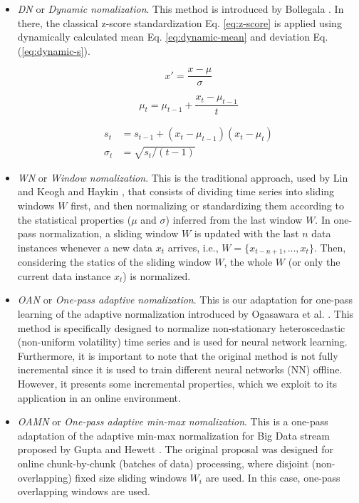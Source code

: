 \documentclass[a4paper]{article}\usepackage[]{graphicx}\usepackage[]{color}
\begin{document}
\begin{itemize}

\item \emph{DN} or \emph{Dynamic nomalization}. This method is introduced by Bollegala \cite{Bollegala2017}. In there, the classical z-score standardization Eq. \eqref{eq:z-score} is applied using dynamically calculated mean Eq. \eqref{eq:dynamic-mean} and deviation Eq. (\ref{eq:dynamic-s}).

\begin{equation}\label{eq:z-score}
    x' = \frac{x - \mu}{\sigma}
\end{equation}

\begin{equation} \label{eq:dynamic-mean}
    \mu_{t} = \mu_{t-1} + \frac{x_{t} - \mu_{t-1}}{t}
\end{equation}

\begin{equation} \begin{aligned} \label{eq:dynamic-s}
    s_{t} &= s_{t-1} + (x_{t} - \mu_{t-1})(x_{t} - \mu_{t}) \\
    \sigma_{t} &= \sqrt{s_{t} / (t-1)}
\end{aligned} \end{equation}

\item \emph{WN} or \emph{Window nomalization}. This is the traditional approach, used by  Lin and Keogh \cite{Lin2004} and Haykin  \cite{haykin2009neural}, that consists of dividing time series into sliding windows $W$ first, and then normalizing or standardizing them according to the statistical properties ($\mu$ and $\sigma$) inferred from the last window $W$. In one-pass normalization, a sliding window $W$ is updated with the last $n$ data instances whenever a new data $x_{t}$ arrives, i.e.,  $W = \{x_{t-n+1}, ..., x_{t}\}$. Then, considering the statics of the sliding window $W$, the whole $W$ (or only the current data instance $x_{t}$) is normalized.

\item \emph{OAN} or \emph{One-pass adaptive nomalization}. This is our adaptation for one-pass learning of the adaptive normalization introduced by Ogasawara et al. \cite{Ogasawara2010}. This method is specifically designed to normalize non-stationary heteroscedastic (non-uniform volatility) time series and is used for neural network learning. Furthermore, it is important to note that the original method is not fully incremental since it is used to train different neural networks (NN) offline. However, it presents some incremental properties, which we exploit to its application in an online environment.

\item \emph{OAMN} or \emph{One-pass adaptive min-max nomalization}. This is a one-pass adaptation of the adaptive min-max normalization for Big Data stream proposed by Gupta and Hewett \cite{Gupta2019}. The original proposal was designed for online chunk-by-chunk (batches of data) processing, where disjoint (non-overlapping) fixed size sliding windows $W_{i}$ are used. In this case, one-pass overlapping windows are used.

\end{itemize}
\end{document}
